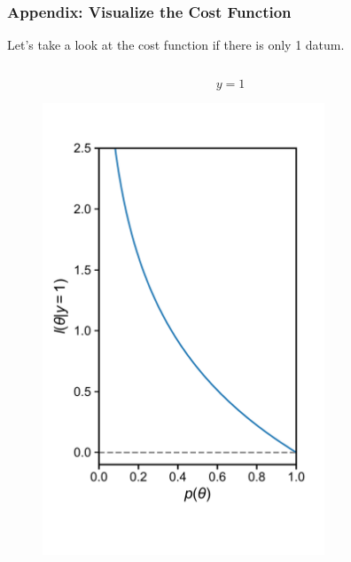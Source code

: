 \documentclass[10pt,aspectratio=169]{beamer}
\begin{document}
      \begin{frame}
        \frametitle{Appendix: Visualize the Cost Function}
        Let's take a look at the cost function if there is only 1
        datum.
        
        \begin{columns}[T]
          \begin{column}{0.5\textwidth}
            \begin{equation*}
              y = 1
            \end{equation*}
            \vspace{-4em}
            \begin{figure}[t]
              \includegraphics[width=0.75\textwidth]{scripts/loss_1.pdf}
            \end{figure}
          \end{column}


\end{columns}
\end{frame}
\end{document}
